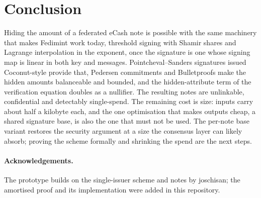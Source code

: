 \documentclass[10pt,a5paper]{article}
\begin{document}
\section{Conclusion}

Hiding the amount of a federated eCash note is possible with the same
machinery that makes Fedimint work today, threshold signing with Shamir shares
and Lagrange interpolation in the exponent, once the signature is one whose
signing map is linear in both key and messages. Pointcheval--Sanders
signatures issued Coconut-style provide that, Pedersen commitments and
Bulletproofs make the hidden amounts balanceable and bounded, and the
hidden-attribute term of the verification equation doubles as a nullifier. The
resulting notes are unlinkable, confidential and detectably single-spend. The
remaining cost is size: inputs carry about half a kilobyte each, and the one
optimisation that makes outputs cheap, a shared signature base, is also the
one that must not be used. The per-note base variant restores the security
argument at a size the consensus layer can likely absorb; proving the scheme
formally and shrinking the spend are the next steps.

\paragraph{Acknowledgements.} The prototype builds on the single-issuer
scheme and notes by joschisan; the amortised proof and its implementation were
added in this repository.
\end{document}

